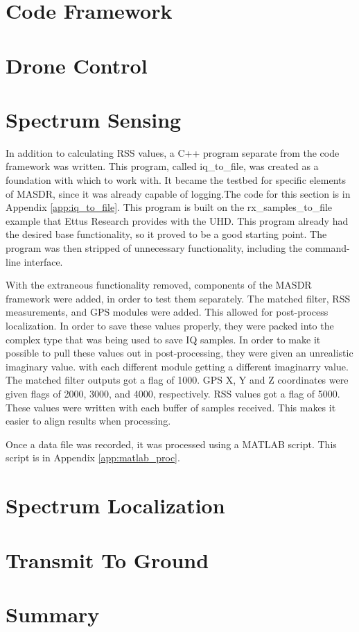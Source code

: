 \section{Code Framework}
\section{Drone Control}
\section{Spectrum Sensing}
In addition to calculating RSS values, a C++ program separate from the code framework
was written. This program, called iq\_to\_file, was created as a foundation with 
which to work with. It became the testbed for specific elements of MASDR, since it
was already capable of logging.The code for this section is in Appendix \ref{app:iq_to_file}. 
This program is built on the rx\_samples\_to\_file example that Ettus Research provides 
with the UHD. This program already had the desired base functionality, so it proved
to be a good starting point. The program was then stripped of unnecessary functionality,
including the command-line interface. \par
With the extraneous functionality removed, components of the MASDR framework were
added, in order to test them separately. The matched filter, RSS measurements, 
and GPS modules were added. This allowed for post-process localization. In order to 
save these values properly, they were packed into the complex type that was being
used to save IQ samples. In order to make it possible to pull these values out
in post-processing, they were given an unrealistic imaginary value. with each different 
module getting a different imaginarry value. The matched filter outputs got 
a flag of 1000. GPS X, Y and Z coordinates were given flags of 2000, 3000, and 4000,
respectively. RSS values got a flag of 5000. These values were written with each 
buffer of samples received. This makes it easier to align results when processing.\par
Once a data file was recorded, it was processed using a MATLAB script. This script 
is in Appendix \ref{app:matlab_proc}.

\section{Spectrum Localization}

\section{Transmit To Ground}
\section{Summary}
